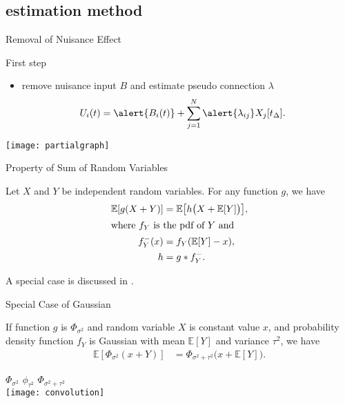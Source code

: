 \documentclass[fleqn,aspectratio=1610]{beamer}
\begin{document}
\subsection{estimation method}
\label{sec:org3c78430}
\begin{frame}[label={sec:orga8a99e4}]{Removal of Nuisance Effect}
\begin{block}{First step}
\begin{itemize}
\item remove nuisance input \(B\) and estimate pseudo connection \(\lambda\)
\begin{align}
  U_i(t)
  &= \alert{B_i(t)} +
    \sum_{j=1}^{N} \alert{\lambda_{ij}} X_j[t_\Delta].
\end{align}
\end{itemize}
\end{block}
\begin{center}
\texttt{[image: partialgraph]}
\end{center}
\end{frame}

\begin{frame}[label={sec:orgf03922d}]{Property of Sum of Random Variables}
\begin{theorem}[]\label{sec:orgce2353b}
Let \(X\) and \(Y\) be independent random variables.
For any function \(g\), we have
\begin{align}
  \mathbb{E}[g(X+Y)]
  &= \mathbb{E}\bigl[h\bigl(X+\mathbb{E}[Y]\bigr)\bigr],\\
  \intertext{where \(f_{Y}\) is the pdf of \(Y\) and}
  f^{-}_{Y}(x) &= f_Y(\mathbb{E}[Y]-x),\\
  h &= g*f^{-}_{Y}.
\end{align}
\end{theorem}
A special case is discussed in \cite{Hyvaerinen2002}.
\end{frame}

\begin{frame}[label={sec:org99dc8fc}]{Special Case of Gaussian}
\begin{corollary}[]\label{sec:orge561c7e}
If function \(g\) is \(\Phi_{\sigma^{2}}\)
and random variable \(X\) is constant value \(x\),
and probability density function \(f_Y\) is Gaussian
with mean \(\mathbb{E}[Y]\) and variance \(\tau^{2}\), we have
\begin{align}
  \mathbb{E}[\Phi_{\sigma^{2}}(x+Y)]
  &=\Phi_{\sigma^{2}+\tau^{2}}\bigl(x+\mathbb{E}[Y]\bigr).
\end{align}
\end{corollary}
\begin{center}
\(\Phi_{\sigma^{2}}\)\hspace{.29\linewidth}
\(\phi_{\tau^{2}}\)\hspace{.24\linewidth}
\(\Phi_{\sigma^{2}\!+\!\tau^{2}}\)\\[0pt]
\texttt{[image: convolution]}    
\end{center}
\end{frame}
\end{document}
